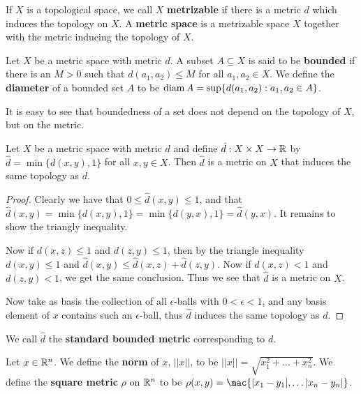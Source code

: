 \begin{definition}
    If $X$ is a topological space, we call  $X$ \textbf {metrizable} if there is a metric $d$ which
    induces the topology on $X$. A \textbf {metric space} is a metrizable space $X$ together with
    the metric inducing the topology of $X$.
\end{definition}

\begin{definition}
    Let $X$ be a metric space with metric $d$. A subset $A \subseteq X$ is said to be \textbf
    {bounded} if there is an $M>0$ such that $d(a_1,a_2) \leq M$ for all $ a_1,a_2 \in X$. We define
    the \textbf{diameter} of a bounded set $A$ to be $\operatorname{diam}{A}=\sup\{d(a_1,a_2):a_1,a_2 \in A\}$.
\end{definition}

It is easy to see that boundedness of a set does not depend on the topology of $X$, but on the
metric.

\begin{theorem}\label{2.2.3}
    Let $X$ be a metric space with metric $d$ and define  $\hat{d}:X \times X \rightarrow \mathbb{R}$ by
    $\hat{d}=\min\{d(x,y),1\}$ for all $x,y \in X$. Then  $\hat{d}$ is a metric on $X$ that induces
    the same topology as  $d$.
\end{theorem}
\begin{proof}
    Clearly we have that $0 \leq \hat{d}(x,y) \leq 1$, and that
    $\hat{d}(x,y)=\min\{d(x,y),1\}=\min\{d(y,x),1\}=\hat{d}(y,x)$. It remains to show the triangly
    inequality.

    Now if $d(x,z) \leq 1$ and $d(z,y) \leq 1$, then by the triangle inequality $d(x,y) \leq 1$ and
    $\hat{d}(x,y) \leq \hat{d}(x,z)+\hat{d}(z,y)$. Now if $d(x,z)<1$ and $d(z,y)<1$, we get the same
    conclusion. Thus we see that $\hat{d}$ is a metric on $X$.

    Now take as basis the collection of all  $\epsilon$-balls with  $0<\epsilon<1$, and any basis
    element of  $x$ contains such an  $\epsilon$-ball, thus  $\hat{d}$ induces the same topology as
    $d$.
\end{proof}

\begin{definition}
    We call $\hat{d}$ the \textbf{standard bounded metric} corresponding to $d$.		
\end{definition}

\begin{definition}
    Let $x \in \mathbb{R}^n$. We define the \textbf {norm} of $x$,  $||x||$, to be
    $||x||=\sqrt{x_1^2+ \dots +x_n^2}$. We define the \textbf{square metric} $\rho$  on 
    $\mathbb{R}^n$ to be  $\rho(x,y)=\mac\{|x_1-y_1|, \dots |x_n-y_n|\}$.
\end{definition}

